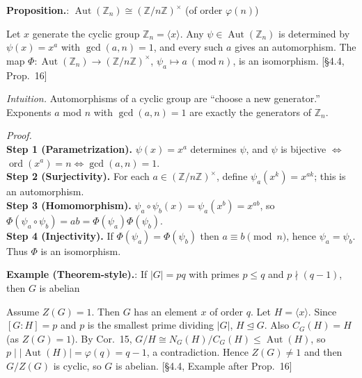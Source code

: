 \documentclass[12pt]{article}
\theoremstyle{definition}
\newcommand{\Aut}{\operatorname{Aut}}
\newcommand{\ord}{\operatorname{ord}}
\begin{document}
\newpage


\noindent\textbf{Proposition.}: $\Aut(\mathbb{Z}_n)\cong (\mathbb{Z}/n\mathbb{Z})^\times$ (of order $\varphi(n)$)

\newpage

Let $x$ generate the cyclic group $\mathbb{Z}_n=\langle x\rangle$. Any $\psi\in\Aut(\mathbb{Z}_n)$ is determined by $\psi(x)=x^a$ with $\gcd(a,n)=1$, and every such $a$ gives an automorphism. The map $\Phi:\Aut(\mathbb{Z}_n)\to(\mathbb{Z}/n\mathbb{Z})^\times$, $\psi_a\mapsto a\ (\mathrm{mod}\ n)$, is an isomorphism. \hfill {\footnotesize [§4.4, Prop.~16]}\\

\dotfill

\emph{Intuition.} Automorphisms of a cyclic group are “choose a new generator.” Exponents $a$ mod $n$ with $\gcd(a,n)=1$ are exactly the generators of $\mathbb{Z}_n$.

\dotfill

\emph{Proof.}\\
\textbf{Step 1 (Parametrization).} $\psi(x)=x^a$ determines $\psi$, and $\psi$ is bijective $\iff$ $\ord(x^a)=n\iff\gcd(a,n)=1$.\\
\textbf{Step 2 (Surjectivity).} For each $a\in(\mathbb{Z}/n\mathbb{Z})^\times$, define $\psi_a(x^k)=x^{ak}$; this is an automorphism.\\
\textbf{Step 3 (Homomorphism).} $\psi_a\circ\psi_b(x)=\psi_a(x^b)=x^{ab}$, so $\Phi(\psi_a\circ\psi_b)=ab=\Phi(\psi_a)\Phi(\psi_b)$.\\
\textbf{Step 4 (Injectivity).} If $\Phi(\psi_a)=\Phi(\psi_b)$ then $a\equiv b\pmod n$, hence $\psi_a=\psi_b$. Thus $\Phi$ is an isomorphism.\\

\newpage


\noindent\textbf{Example (Theorem-style).}: If $|G|=pq$ with primes $p\le q$ and $p\nmid(q-1)$, then $G$ is abelian

\newpage

Assume $Z(G)=1$. Then $G$ has an element $x$ of order $q$. Let $H=\langle x\rangle$. Since $[G:H]=p$ and $p$ is the smallest prime dividing $|G|$, $H\trianglelefteq G$. Also $C_G(H)=H$ (as $Z(G)=1$). By Cor.~15, $G/H\cong N_G(H)/C_G(H)\le \Aut(H)$, so $p\mid |\Aut(H)|=\varphi(q)=q-1$, a contradiction. Hence $Z(G)\ne 1$ and then $G/Z(G)$ is cyclic, so $G$ is abelian. \hfill {\footnotesize [§4.4, Example after Prop.~16]}\\
\end{document}
